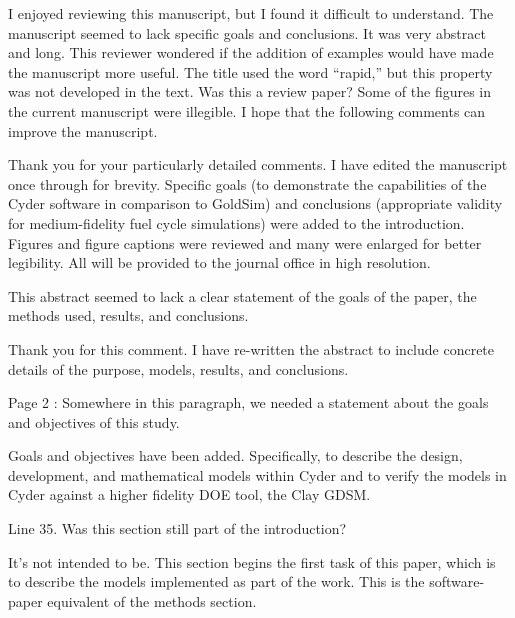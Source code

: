\documentclass[answers,12pt]{exam}
\begin{document}
\begin{questions}
\question I enjoyed reviewing this manuscript, but I found it difficult to 
        understand.
The manuscript seemed to lack specific goals and conclusions. It was very
abstract and long.  This reviewer wondered if the addition of examples would
have made the manuscript more useful. The title used the word ``rapid,'' but 
        this
property was not developed in the text. Was this a review paper? Some of the
figures in the current manuscript were illegible. I hope that the following
comments can improve the manuscript.
\begin{solution}
Thank you for your particularly detailed comments. I have edited the manuscript
        once through for brevity.  Specific goals (to demonstrate the 
        capabilities of the Cyder software in comparison to GoldSim) and 
        conclusions (appropriate validity for medium-fidelity fuel cycle 
        simulations) were added to the introduction.  Figures and figure 
        captions were reviewed and many were enlarged for better legibility. 
        All will be provided to the journal office in high resolution.
\end{solution}

\question This abstract seemed to lack a clear statement of the goals of the 
        paper, the methods used, results, and conclusions.
\begin{solution}
Thank you for this comment. I have re-written the abstract to include concrete 
details of the purpose, models, results, and conclusions.  \end{solution}

\question Page 2 : Somewhere in this paragraph, we needed a statement about the 
        goals and objectives of this study.
\begin{solution}
Goals and objectives have been added. Specifically, to describe the design, 
        development, and mathematical models within Cyder and to verify the 
        models in Cyder against a higher fidelity DOE tool, the Clay GDSM.
\end{solution}


\question Line 35. Was this section still part of the introduction?

\begin{solution}
It's not intended to be. This section begins the first task of this paper, 
        which is to describe the models implemented as part of the work. This 
        is the software-paper equivalent of the methods section.
\end{solution}


\end{questions}
\end{document}
